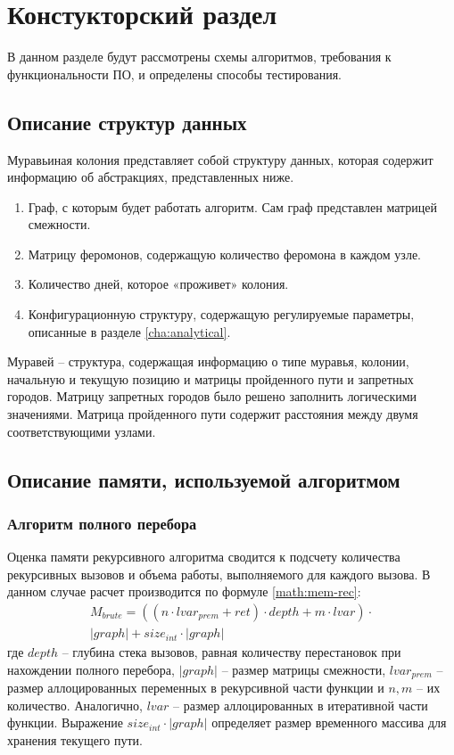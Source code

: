 \chapter{ Констукторский раздел}
\label{cha:design}
    В данном разделе будут рассмотрены схемы алгоритмов, требования к функциональности ПО, и определены способы тестирования.
    
    \section{Описание структур данных}
        Муравьиная колония представляет собой структуру данных, которая содержит информацию об абстракциях, представленных ниже.
        \begin{enumerate}
            \item Граф, с которым будет работать алгоритм. Сам граф представлен матрицей смежности.
            \item Матрицу феромонов, содержащую количество феромона в каждом узле.
            \item Количество дней, которое «проживет» колония.
            \item Конфигурационную структуру, содержащую регулируемые параметры, описанные в разделе \ref{cha:analytical}.
        \end{enumerate}
        Муравей -- структура, содержащая информацию о типе муравья, колонии, начальную и текущую позицию и матрицы пройденного пути и запретных городов. Матрицу запретных городов было решено заполнить логическими значениями. Матрица пройденного пути содержит расстояния между двумя соответствующими узлами.
    \section{Описание памяти, используемой алгоритмом}

\subsection{Алгоритм полного перебора}
Оценка памяти рекурсивного алгоритма сводится к подсчету количества рекурсивных вызовов и объема работы, выполняемого для каждого вызова. В данном случае расчет производится по формуле \ref{math:mem-rec}:
\begin{equation}\label{math:mem-rec}
    \begin{array}{c}
        M_{brute} = \left(\left(n \cdot lvar_{prem} + ret\right) \cdot depth + m \cdot lvar\right) \cdot \\
        |graph| + size_{int} \cdot |graph|
    \end{array}
\end{equation}
где $depth$ -- глубина стека вызовов, равная количеству перестановок при нахождении полного перебора, $|graph|$ -- размер матрицы смежности, $lvar_{prem}$ -- размер аллоцированных переменных в рекурсивной части функции и $n, m$ -- их количество. Аналогично, $lvar$ -- размер аллоцированных в итеративной части функции. Выражение $size_{int} \cdot |graph|$ определяет размер временного массива для хранения текущего пути.

